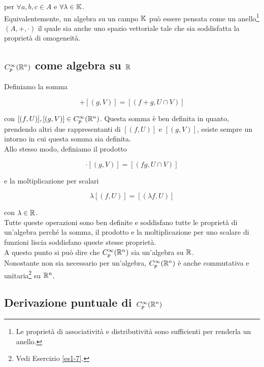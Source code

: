 per $ \forall a,b,c \in A $ e $ \forall \lambda \in \mathbb{K} $.\\
Equivalentemente, un algebra su un campo $ \mathbb{K} $ può essere pensata come un anello\footnote{%
	Le proprietà di associatività e distributività sono sufficienti per renderla un anello.%
} $ (A,+,\cdot) $ il quale sia anche uno spazio vettoriale tale che sia soddisfatta la proprietà di omogeneità.

\subsection{$ C_{p}^{\infty}(\mathbb{R}^{n}) $ come algebra su $ \mathbb{R} $}

Definiamo la somma

\begin{equation}
	[(f,U)] + [(g,V)] = [(f + g,U \cap V)]
\end{equation}

con $ [(f,U)], [(g,V)] \in C_{p}^{\infty}(\mathbb{R}^{n}) $. Questa somma è ben definita in quanto, prendendo altri due rappresentanti di $ [(f,U)] $ e $ [(g,V)] $, esiste sempre un intorno in cui questa somma sia definita.\\
Allo stesso modo, definiamo il prodotto

\begin{equation}
	[(f,U)] \cdot [(g,V)] = [(f g,U \cap V)]
\end{equation}

e la moltiplicazione per scalari

\begin{equation}
	\lambda [(f,U)] = [(\lambda f,U)]
\end{equation}

con $ \lambda \in \mathbb{R} $.\\
Tutte queste operazioni sono ben definite e soddisfano tutte le proprietà di un'algebra perché la somma, il prodotto e la moltiplicazione per uno scalare di funzioni liscia soddisfano queste stesse proprietà.\\
A questo punto si può dire che $ C_{p}^{\infty}(\mathbb{R}^{n}) $ sia un'algebra su $ \mathbb{R} $.\\
Nonostante non sia necessario per un'algebra, $ C_{p}^{\infty}(\mathbb{R}^{n}) $ è anche commutativa e unitaria\footnote{%
	Vedi Esercizio \ref{es1-7}.%
} su $ \mathbb{R}^{n} $.

\subsection{Derivazione puntuale di $ C_{p}^{\infty}(\mathbb{R}^{n}) $}

